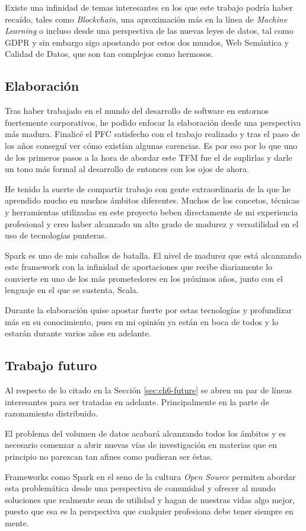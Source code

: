 Existe una infinidad de temas interesantes en los que este trabajo podría haber
recaído, tales como \textit{Blockchain}, una aproximación más en la línea de
\textit{Machine Learning} o incluso desde una perspectiva de las nuevas leyes de
datos, tal como \acf{GDPR} y sin embargo sigo apostando por estos dos mundos,
Web Semántica y Calidad de Datos, que son tan complejos como hermosos. 

\subsection{Elaboración}

Tras haber trabajado en el mundo del desarrollo de software en entornos
fuertemente corporativos, he podido enfocar la elaboración desde una perspectiva
más madura. Finalicé el \acs{PFC} satisfecho con el trabajo realizado y tras el
paso de los años conseguí ver cómo existían algunas carencias. Es por eso por lo
que uno de los primeros pasos a la hora de abordar este \acs{TFM} fue el de
suplirlas y darle un tono más formal al desarrollo de entonces con los ojos de
ahora. 

He tenido la suerte de compartir trabajo con gente extraordinaria de la que he
aprendido mucho en muchos ámbitos diferentes. Muchos de los concetos, técnicas y
herramientas utilizadas en este proyecto beben directamente de mi experiencia
profesional y creo haber alcanzado un alto grado de madurez y versatilidad en el
uso de tecnologías punteras. 

Spark es uno de mis caballos de batalla. El nivel de madurez que está alcanzando
este framework con la infinidad de aportaciones que recibe diariamente lo
convierte en uno de los más prometedores en los próximos años, junto con el
lenguaje en el que se sustenta, Scala. 

Durante la elaboración quise apostar fuerte por estas tecnologías y profundizar
más en su conocimiento, pues en mi opinión ya están en boca de todos y lo
estarán durante varios años en adelante. 

\subsection{Trabajo futuro}


Al respecto de lo citado en la Sección \ref{sec:ch6-future} se abren un par de
líneas interesantes para ser tratadas en adelante. Principalmente en la parte de
razonamiento distribuido. 

El problema del volumen de datos acabará alcanzando todos los ámbitos y es
necesario comenzar a abrir nuevas vías de investigación en materias que en
principio no parezcan tan afines como pudieran ser éstas. 

Frameworks como Spark en el seno de la cultura \textit{Open Source} permiten
abordar esta problemática desde una perspectiva de comunidad y ofrecer al mundo
soluciones que realmente sean de utilidad y hagan de nuestras vidas algo mejor,
puesto que esa es la perspectiva que cualquier profesiona debe tener siempre en
mente. 
